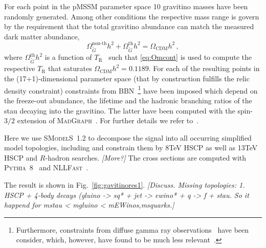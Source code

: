 \documentclass[preprint,number,sort&compress,twocolumn,3p]{elsstyarticle}
\newcommand{\s}[1]{\widetilde{#1}}
\newcommand{\GEV}{\ensuremath{\,\textnormal{GeV}}}
\newcommand{\smo}{\textsc{SModelS}}
\newcommand{\com}[1]{\emph{\color{red}[#1]}}  %
\begin{document}
For each point in the pMSSM parameter
space 10 gravitino masses have been randomly generated. Among other conditions the respective mass range is govern
by the requirement that the total gravitino abundance can match the measured dark matter abundance, 
\begin{equation}
\label{eq:Omcont}
\Omega_{\s G}^{\text{non-th}} h^2+\Omega^{\text{th}}_{\s G}h^2  = \Omega_\text{CDM}h^2\,,
\end{equation}
where
$\Omega^{\text{th}}_{\s G}h^2$ is a function of $T_\text{R}$~\cite{Bolz:1998ek,Bolz:2000fu,Pradler:2006hh}
such that \eqref{eq:Omcont} is used
to compute the respective $T_\text{R}$ that saturates $\Omega_\text{CDM}h^2=0.1189$. %
For each of the resulting points in the (17+1)-dimensional parameter space (that by construction fulfills the
relic density constraint) constraints from BBN~\cite{Jedamzik:2007qk,Jedamzik:2006xz}\footnote{Furthermore, constraints from diffuse gamma ray
observations~\cite{Sreekumar:1997yg,Kribs:1996ac} have been consider, which, however, have found to be much less relevant~\cite{Heisig:2013sva}.}
have been imposed which depend on the freeze-out abundance, the lifetime and the hadronic branching ratios
of the stau decaying into the gravitino. The latter have been computed with the spin-$3/2$ extension of \textsc{MadGraph}~\cite{Hagiwara:2010pi,Alwall:2007st}. For further details we refer to~\cite{Heisig:2013rya,Heisig:2013sva}.

Here we use \smo~1.2 to decompose the signal into all occurring simplified model topologies, including and
constrain them by 8TeV HSCP as well as 13TeV HSCP and $R$-hadron searches. 
\com{More?}
The cross sections are computed with \textsc{Pythia}~8~\cite{} and \textsc{NLLFast}~\cite{}.

The result is shown in Fig.~\ref{fig:gavitinores1}. \com{Discuss. Missing topologies: 1. HSCP + 4-body decays (gluino -> sq* + jet -> ewino* + q -> f + stau. So it happend for mstau  < mgluino < mEWinos,msquarks.}




%
\end{document}
